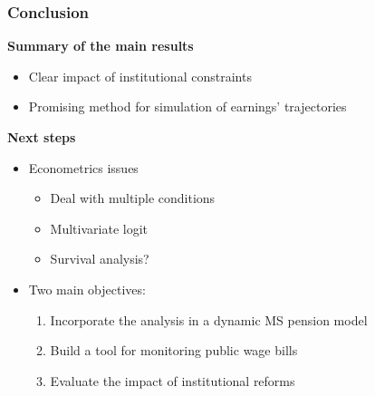 \documentclass[xcolor=table,ignorenonframetext,12pt]{beamer}
\newenvironment{choixmarges}[2]{\begin{list}{}{%
\setlength{\topsep}{0pt}%
\setlength{\leftmargin}{0pt}%
\setlength{\rightmargin}{0pt}%
\setlength{\listparindent}{\parindent}%
\setlength{\itemindent}{\parindent}%
\setlength{\parsep}{0pt plus 1pt}%
\addtolength{\leftmargin}{#1}%
\addtolength{\rightmargin}{#2}%
}\item }{\end{list}}
\begin{document}
\begin{frame}

\frametitle{Conclusion}

\begin{choixmarges}{-0.5cm}{-0.5cm}
	
	
	\textbf{Summary of the main results}
	
	\begin{itemize}
		\item Clear impact of institutional constraints
		\item Promising method for simulation of earnings' trajectories
	\end{itemize}
	
	\vspace{0.2cm}
	\textbf{Next steps}
	
	\begin{itemize}
		\item Econometrics issues
		\begin{itemize}
			\item Deal with multiple conditions
			\item Multivariate logit
			\item Survival analysis?
		\end{itemize}
		\item Two main objectives: 
		\begin{enumerate}
			\item Incorporate the analysis in a dynamic MS pension model
			\item Build a tool for monitoring public wage bills
			\item Evaluate the impact of institutional reforms
		\end{enumerate}
		
	\end{itemize}
	
	
\end{choixmarges}
\end{frame}
\end{document}
